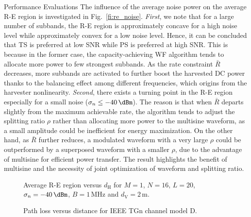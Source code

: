 \documentclass[journal]{IEEEtran}
\begin{document}
\begin{section}{Performance Evaluations}
		The influence of the average noise power on the average R-E region is investigated in Fig.~\ref{fi:re_noise}. \textit{First}, we note that for a large number of subbands, the R-E region is approximately concave for a high noise level while approximately convex for a low noise level. Hence, it can be concluded that TS is preferred at low SNR while PS is preferred at high SNR. This is because in the former case, the capacity-achieving WF algorithm tends to allocate more power to few strongest subbands. As the rate constraint $\bar{R}$ decreases, more subbands are activated to further boost the harvested DC power thanks to the balancing effect among different frequencies, which origins from the harvester nonlinearity. \textit{Second}, there exists a turning point in the R-E region especially for a small noise ($\sigma_n \le -40\,\si{\dBm}$). The reason is that when $\bar{R}$ departs slightly from the maximum achievable rate, the algorithm tends to adjust the splitting ratio $\rho$ rather than allocating more power to the multisine waveform, as a small amplitude could be inefficient for energy maximization. On the other hand, as $\bar{R}$ further reduces, a modulated waveform with a very large $\rho$ could be outperformed by a superposed waveform with a smaller $\rho$, due to the advantage of multisine for efficient power transfer. The result highlights the benefit of multisine and the necessity of joint optimization of waveform and splitting ratio.

		\begin{figure}[!t]
			\centering
			\begin{adjustbox}{width=0.9\columnwidth}
				
			\end{adjustbox}
			\caption{Average R-E region versus $d_{\mathrm{H}}$ for $M=1$, $N=16$, $L=20$, $\sigma_n=-40\,\si{\dBm}$, $B=1\,\si{\MHz}$ and $d_{\mathrm{V}}=2\,\si{\meter}$.}
			\label{fi:re_distance}
		\end{figure}

		\begin{figure}[!t]
			\centering
			\begin{adjustbox}{width=0.9\columnwidth}
				
			\end{adjustbox}
			\caption{Path loss versus distance for IEEE TGn channel model D.}
			\label{fi:path_loss}
		\end{figure}


\end{section}
\end{document}
